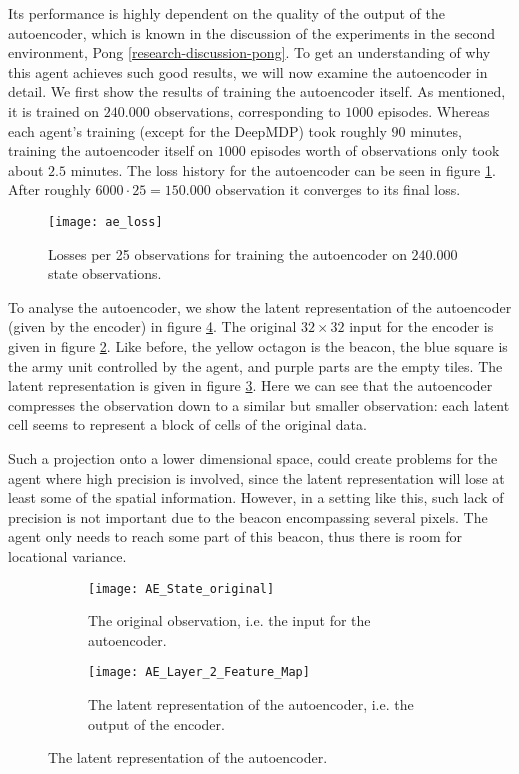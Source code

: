 Its performance is highly dependent on the quality of the output of the autoencoder, which is known in the discussion of the experiments in the second environment, Pong \ref{research-discussion-pong}. To get an understanding of why this agent achieves such good results, we will now examine the autoencoder in detail. We first show the results of training the autoencoder itself. As mentioned, it is trained on $240.000$ observations, corresponding to $1000$ episodes. Whereas each agent's training (except for the DeepMDP) took roughly $90$ minutes, training the autoencoder itself on $1000$ episodes worth of observations only took about $2.5$ minutes. The loss history for the autoencoder can be seen in figure \ref{fig:ae-loss}. After roughly $6000 \cdot 25 = 150.000$ observation it converges to its final loss.

\begin{figure}[h!]
    \centering
    \texttt{[image: ae\_loss]}
    \caption{Losses per 25 observations for training the autoencoder on $240.000$ state observations.}
    \label{fig:ae-loss}
\end{figure}

To analyse the autoencoder, we show the latent representation of the autoencoder (given by the encoder) in figure \ref{fig:ae-featuremap}. The original $32 \times 32$ input for the encoder is given in figure \ref{fig:ae-featuremap-original}. Like before, the yellow octagon is the beacon, the blue square is the army unit controlled by the agent, and purple parts are the empty tiles. The latent representation is given in figure \ref{fig:ae-featuremap-layer2}. Here we can see that the autoencoder compresses the observation down to a similar but smaller observation: each latent cell seems to represent a block of cells of the original data. 

Such a projection onto a lower dimensional space, could create problems for the agent where high precision is involved, since the latent representation will lose at least some of the spatial information. However, in a setting like this, such lack of precision is not important due to the beacon encompassing several pixels. The agent only needs to reach some part of this beacon, thus there is room for locational variance. 

\begin{figure}[h!]
	\centering
	\begin{subfigure}[b]{1\textwidth}
		\texttt{[image: AE\_State\_original]}
		\caption{The original observation, i.e. the input for the autoencoder.}
		\label{fig:ae-featuremap-original} 
	\end{subfigure}
	\begin{subfigure}[b]{1\textwidth}
		\texttt{[image: AE\_Layer\_2\_Feature\_Map]}
		\caption{The latent representation of the autoencoder, i.e. the output of the encoder.}
		\label{fig:ae-featuremap-layer2}
	\end{subfigure}
	\caption{The latent representation of the autoencoder.}
	\label{fig:ae-featuremap}
\end{figure}

